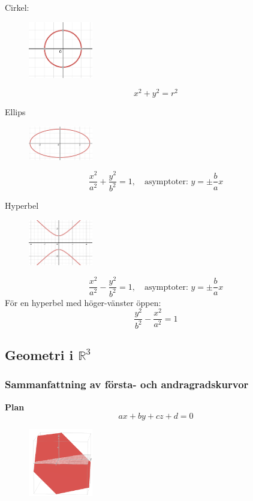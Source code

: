 \documentclass[a4paper,12pt]{article}
\begin{document}
Cirkel:
\begin{figure}[H]
  \centering
  \includegraphics[width=0.25\textwidth]{cirkel.png}
  \caption{}
\end{figure}
\[
x^2 + y^2 = r^2
\]

Ellips
\begin{figure}[H]
  \centering
  \includegraphics[width=0.25\textwidth]{ellips.png}
  \caption{}
\end{figure}
\[
\frac{x^2}{a^2} + \frac{y^2}{b^2} = 1, \quad \text{asymptoter: } y = \pm \frac{b}{a}x
\]

Hyperbel
\begin{figure}[H]
  \centering
  \includegraphics[width=0.25\textwidth]{hyperbel.png}
  \caption{}
\end{figure}
\[
\frac{x^2}{a^2} - \frac{y^2}{b^2} = 1, \quad \text{asymptoter: } y = \pm \frac{b}{a}x
\]
För en hyperbel med höger-vänster öppen:
\[
\frac{y^2}{b^2} - \frac{x^2}{a^2} = 1
\]

\subsection{Geometri i $\mathbb{R}^3$}
\subsubsection*{Sammanfattning av första- och andragradskurvor}

\textbf{Plan}
\[
ax + by + cz + d = 0
\]
\begin{figure}[H]
  \centering
  \includegraphics[width=0.25\textwidth]{plan.png}
  \caption{}
\end{figure}
\end{document}

